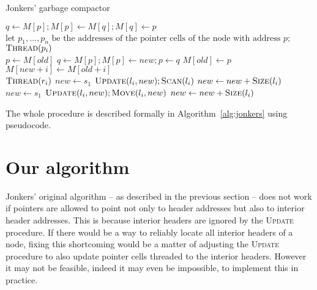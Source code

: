 \documentclass[10pt,a4paper,final,twocolumn]{article}
\begin{document}
\begin{algorithm}[htb!]
  \caption{Jonkers' garbage compactor}
  \label{alg:jonkers}
  {\footnotesize\begin{algorithmic}[0]
        \State $q \gets M[p]; M[p] \gets M[q]; M[q] \gets p$
      \EndIf
    \EndProcedure
    \\
      \State $\mbox{let $p_1,\ldots,p_n$ be the addresses of the}$
      \State $\mbox{pointer cells of the node with address $p$}$;
        \State $\Call{Thread}{p_i}$
      \EndFor
    \EndProcedure
    \\
      \State $p \gets M[old]$
        \State $q \gets M[p]; M[p] \gets new; p \gets q$
      \EndWhile
      \State $M[old] \gets p$
    \EndProcedure
    \\
        \State $M[new + i] \gets M[old + i]$
      \EndFor
    \EndProcedure
    \\
        \State $\Call{Thread}{r_i}$
      \EndFor
      \State $new \gets s_1$ %
        \State $\Call{Update}{l_i,new};\Call{Scan}{l_i}$
        \State $new \gets new + \Call{Size}{l_i}$
      \EndFor
      \State $new \gets s_1$ %
        \State $\Call{Update}{l_i,new};\Call{Move}{l_i,new}$
        \State $new \gets new + \Call{Size}{l_i}$
      \EndFor
    \EndProcedure
  \end{algorithmic}}
\end{algorithm}

The whole procedure is described formally in Algorithm~\ref{alg:jonkers} using pseudocode.


\section{Our algorithm}
\label{sec:our}


Jonkers' original algorithm -- as described in the previous section -- does not work if pointers
are allowed to point not only to header addresses but also to interior header addresses. This is because
interior headers are ignored by the \textsc{Update} procedure. If there would be a way to reliably
locate all interior headers of a node, fixing this shortcoming would be a matter of adjusting the
\textsc{Update} procedure to also update pointer cells threaded to the interior headers.
However it may not be feasible, indeed it may even be impossible, to implement this in practice.
\end{document}
